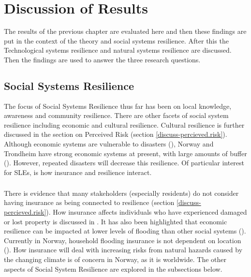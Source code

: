 

\chapter{Discussion of Results}
 The results of the previous chapter are evaluated here and then these findings are put in the context of the theory and social systems resilience. After this the Technological systems resilience and natural systems resilience are discussed. Then the findings are used to answer the three research questions.


\section{Social Systems Resilience}
The focus of Social Systems Resilience thus far has been on local knowledge, awareness and community resilience. There are other facets of social system resilience including economic and cultural resilience. Cultural resilience is further discussed in the section on Perceived Risk (section \ref{discuss-percieved.risk}). Although economic systems are vulnerable to disasters (\cite{head_comment_2020}), Norway and Trondheim have strong economic systems at present, with large amounts of buffer (\cite{lujala_climate_2015}). However, repeated disasters will decrease this resilience. Of particular interest for SLEs, is how insurance and resilience interact.
\paragraph{}

There is evidence that many stakeholders (especially residents) do not consider having insurance as being connected to resilience (section \ref{discuss-percieved.risk}). How insurance affects individuals who have experienced damaged or lost property is discussed in \cite{whitmarsh_are_2008}. It has also been highlighted that economic resilience can be impacted at lower levels of flooding than other social systems (\cite{cutter_community_2020}). Currently in Norway, household flooding insurance is not dependent on location (\cite{lujala_climate_2015}).  How insurance will deal with increasing risks from natural hazards caused by the changing climate is of concern in Norway, as it is worldwide. The other aspects of Social System Resilience are explored in the subsections below.


